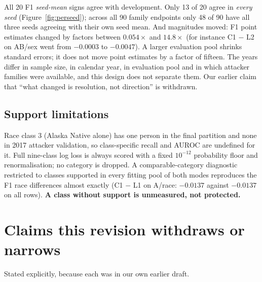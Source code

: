 \documentclass[10pt]{article}
\begin{document}
All 20 F1 \emph{seed-mean} signs agree with development. Only 13 of 20 agree in \emph{every seed}
(Figure~\ref{fig:perseed}); across all 90 family endpoints only 48 of 90 have all three seeds
agreeing with their own seed mean. And magnitudes moved: F1 point estimates changed by factors
between $0.054\times$ and $14.8\times$ (for instance C1 $-$ L2 on AB/sex went from $-0.0003$ to
$-0.0047$). A larger evaluation pool shrinks standard errors; it does not move point estimates by a
factor of fifteen. The years differ in sample size, in calendar year, in evaluation pool and in which
attacker families were available, and this design does not separate them. Our earlier claim that
``what changed is resolution, not direction'' is withdrawn.

\subsection{Support limitations}

Race class 3 (Alaska Native alone) has one person in the final partition and none in 2017 attacker
validation, so class-specific recall and AUROC are undefined for it. Full nine-class log loss is
always scored with a fixed $10^{-12}$ probability floor and renormalisation; no category is dropped.
A comparable-category diagnostic restricted to classes supported in every fitting pool of both modes
reproduces the F1 race differences almost exactly (C1 $-$ L1 on A/race: $-0.0137$ against $-0.0137$
on all rows). \textbf{A class without support is unmeasured, not protected.}

\section{Claims this revision withdraws or narrows}
\label{sec:withdrawn}

Stated explicitly, because each was in our own earlier draft.
\end{document}
